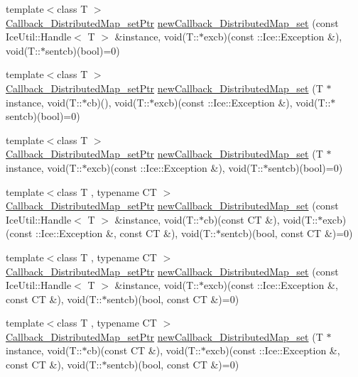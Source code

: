\begin{DoxyCompactItemize}
\item 
{\footnotesize template$<$class T $>$ }\\\hyperlink{namespace_global_table_a8196b91ca3241e16fd9aac727da95e02}{Callback\_\-DistributedMap\_\-setPtr} \hyperlink{namespace_global_table_a0e48ba25029d2bafc7bead9a05364343}{newCallback\_\-DistributedMap\_\-set} (const IceUtil::Handle$<$ T $>$ \&instance, void(T::$\ast$excb)(const ::Ice::Exception \&), void(T::$\ast$sentcb)(bool)=0)
\item 
{\footnotesize template$<$class T $>$ }\\\hyperlink{namespace_global_table_a8196b91ca3241e16fd9aac727da95e02}{Callback\_\-DistributedMap\_\-setPtr} \hyperlink{namespace_global_table_a224c08de8e24e76d56f269e944ddfb09}{newCallback\_\-DistributedMap\_\-set} (T $\ast$instance, void(T::$\ast$cb)(), void(T::$\ast$excb)(const ::Ice::Exception \&), void(T::$\ast$sentcb)(bool)=0)
\item 
{\footnotesize template$<$class T $>$ }\\\hyperlink{namespace_global_table_a8196b91ca3241e16fd9aac727da95e02}{Callback\_\-DistributedMap\_\-setPtr} \hyperlink{namespace_global_table_a9ba899f6d4548f421c542b6887a5e7c7}{newCallback\_\-DistributedMap\_\-set} (T $\ast$instance, void(T::$\ast$excb)(const ::Ice::Exception \&), void(T::$\ast$sentcb)(bool)=0)
\item 
{\footnotesize template$<$class T , typename CT $>$ }\\\hyperlink{namespace_global_table_a8196b91ca3241e16fd9aac727da95e02}{Callback\_\-DistributedMap\_\-setPtr} \hyperlink{namespace_global_table_a360f94ab75c45063c44313055a16277c}{newCallback\_\-DistributedMap\_\-set} (const IceUtil::Handle$<$ T $>$ \&instance, void(T::$\ast$cb)(const CT \&), void(T::$\ast$excb)(const ::Ice::Exception \&, const CT \&), void(T::$\ast$sentcb)(bool, const CT \&)=0)
\item 
{\footnotesize template$<$class T , typename CT $>$ }\\\hyperlink{namespace_global_table_a8196b91ca3241e16fd9aac727da95e02}{Callback\_\-DistributedMap\_\-setPtr} \hyperlink{namespace_global_table_a774135e26623bb25e85e21050e4736dd}{newCallback\_\-DistributedMap\_\-set} (const IceUtil::Handle$<$ T $>$ \&instance, void(T::$\ast$excb)(const ::Ice::Exception \&, const CT \&), void(T::$\ast$sentcb)(bool, const CT \&)=0)
\item 
{\footnotesize template$<$class T , typename CT $>$ }\\\hyperlink{namespace_global_table_a8196b91ca3241e16fd9aac727da95e02}{Callback\_\-DistributedMap\_\-setPtr} \hyperlink{namespace_global_table_aba7735d6f323646d833fd862cb479c39}{newCallback\_\-DistributedMap\_\-set} (T $\ast$instance, void(T::$\ast$cb)(const CT \&), void(T::$\ast$excb)(const ::Ice::Exception \&, const CT \&), void(T::$\ast$sentcb)(bool, const CT \&)=0)

\end{DoxyCompactItemize}
